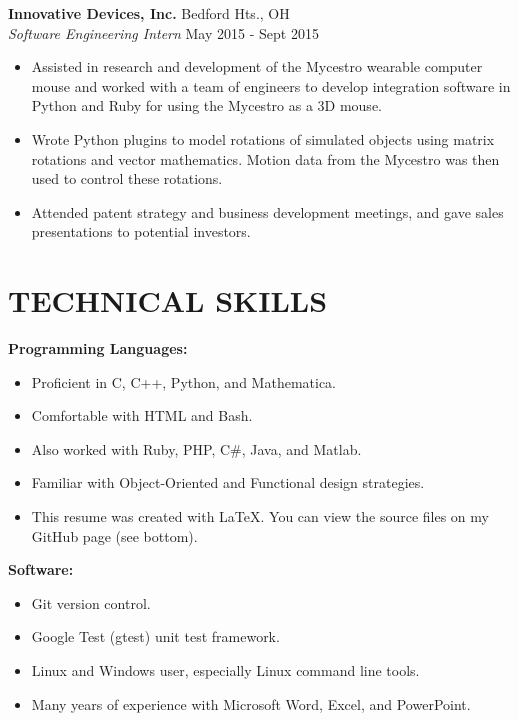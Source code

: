 \documentclass[margin,11pt]{res}
\begin{document}
\begin{resume}
\pagebreak

\vspace{-10pt}
\textbf{Innovative Devices, Inc.} \hfill Bedford Hts., OH\\
\textsl{Software Engineering Intern} \hfill May 2015 - Sept 2015
\begin{itemize}
    \itemsep -2pt
    \item Assisted in research and development of the Mycestro wearable computer
          mouse and worked with a team of engineers to develop integration
          software in Python and Ruby for using the Mycestro as a 3D mouse.
    \item Wrote Python plugins to model rotations of simulated objects using
          matrix rotations and vector mathematics. Motion data from the Mycestro
          was then used to control these rotations.
    \item Attended patent strategy and business development meetings, and gave
          sales presentations to potential investors.
\end{itemize}

\vspace{-10pt}
\section{TECHNICAL SKILLS}
\textbf{Programming Languages:}\\
\vspace{-10pt}
\begin{itemize}
    \itemsep -2pt
    \item Proficient in C, C++, Python, and Mathematica.
    \item Comfortable with HTML and Bash.
    \item Also worked with Ruby, PHP, C\#, Java, and Matlab.
    \item Familiar with Object-Oriented and Functional design strategies.
    \item This resume was created with LaTeX.
          You can view the source files on my GitHub page (see bottom).
\end{itemize}

\vspace{-10pt}
\textbf{Software:}
\begin{itemize}
    \itemsep -2pt
    \item Git version control.
    \item Google Test (gtest) unit test framework.
    \item Linux and Windows user, especially Linux command line tools.
    \item Many years of experience with Microsoft Word, Excel, and PowerPoint.
\end{itemize}


\end{resume}
\end{document}
